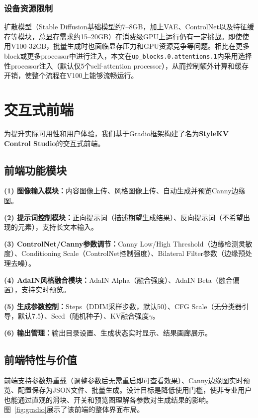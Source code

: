 \documentclass[10pt,twocolumn]{article}
\begin{document}
\subsubsection{设备资源限制}

扩散模型（Stable Diffusion基础模型约7--8GB，加上VAE、ControlNet以及特征缓存等模块，总显存需求约15--20GB）在消费级GPU上运行仍有一定挑战。即使使用V100-32GB，批量生成时也面临显存压力和GPU资源竞争等问题。相比在更多block或更多processor中进行注入，本文在\texttt{up\_blocks.0.attentions.1}内采用选择性processor注入（默认仅5个self-attention processor），从而控制额外计算和缓存开销，使整个流程在V100上能够流畅运行。

\section{交互式前端}

为提升实际可用性和用户体验，我们基于Gradio框架构建了名为\textbf{StyleKV Control Studio}的交互式前端。

\subsection{前端功能模块}

{\bfseries (1) 图像输入模块：}内容图像上传、风格图像上传、自动生成并预览Canny边缘图。

{\bfseries (2) 提示词控制模块：}正向提示词（描述期望生成结果）、反向提示词（不希望出现的元素），支持长文本输入。

{\bfseries (3) ControlNet/Canny参数调节：}Canny Low/High Threshold（边缘检测灵敏度）、Conditioning Scale（ControlNet控制强度）、Bilateral Filter参数（边缘预处理去噪）。

{\bfseries (4) AdaIN风格融合模块：}AdaIN Alpha（融合强度）、AdaIN Beta（融合偏置），支持实时预览。

{\bfseries (5) 生成参数控制：}Steps（DDIM采样步数，默认50）、CFG Scale（无分类器引导，默认7.5）、Seed（随机种子）、KV融合强度$\gamma$。

{\bfseries (6) 输出管理：}输出目录设置、生成状态实时显示、结果画廊展示。

\subsection{前端特性与价值}

前端支持参数热重载（调整参数后无需重启即可查看效果）、Canny边缘图实时预览、配置保存为JSON文件、批量生成。设计目标是降低使用门槛，使非专业用户也能通过直观的滑块、开关和预览图理解各参数对生成结果的影响。图~\ref{fig:gradio}展示了该前端的整体界面布局。
\end{document}
